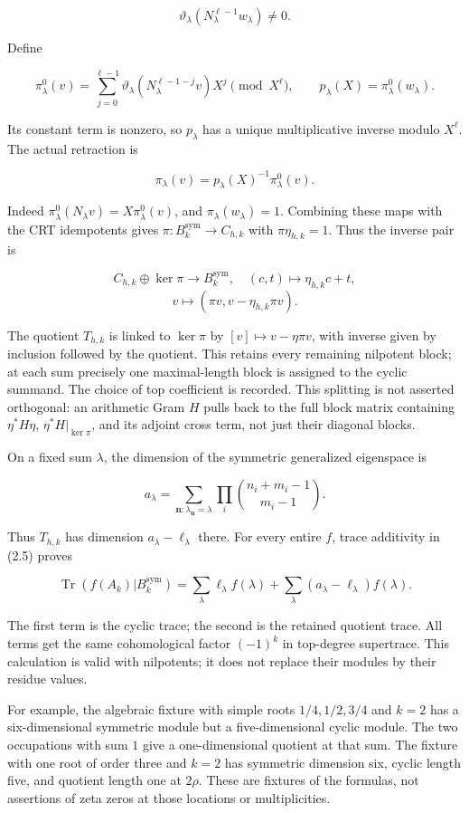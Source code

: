 \[\vartheta_\lambda(N_\lambda^{\ell-1}w_\lambda)\ne0.\]

Define

\[\pi^0_\lambda(v)=\sum_{j=0}^{\ell-1}
\vartheta_\lambda(N_\lambda^{\ell-1-j}v)X^j\pmod{X^\ell},\qquad
p_\lambda(X)=\pi^0_\lambda(w_\lambda).\]

Its constant term is nonzero, so \(p_\lambda\) has a unique
multiplicative inverse modulo \(X^\ell\). The actual retraction is

\[\boxed{\pi_\lambda(v)=p_\lambda(X)^{-1}\pi^0_\lambda(v).}\tag{2.5a}\]

Indeed \(\pi^0_\lambda(N_\lambda v)=X\pi^0_\lambda(v)\), and
\(\pi_\lambda(w_\lambda)=1\). Combining these maps with the CRT
idempotents gives \(\pi:B_k^{\mathrm{sym}}\to C_{h,k}\) with
\(\pi\eta_{h,k}=1\). Thus the inverse pair is

\[C_{h,k}\oplus\ker\pi\longrightarrow B_k^{\mathrm{sym}},\quad(c,t)\mapsto\eta_{h,k}c+t,\]
\[v\longmapsto(\pi v,v-\eta_{h,k}\pi v).\tag{2.5b}\]

The quotient \(T_{h,k}\) is linked to \(\ker\pi\) by
\([v]\mapsto v-\eta\pi v\), with inverse given by inclusion followed by
the quotient. This retains every remaining nilpotent block; at each sum
precisely one maximal-length block is assigned to the cyclic summand.
The choice of top coefficient is recorded. This splitting is not
asserted orthogonal: an arithmetic Gram \(H\) pulls back to the full
block matrix containing \(\eta^*H\eta\), \(\eta^*H|_{\ker\pi}\), and its
adjoint cross term, not just their diagonal blocks.

On a fixed sum \(\lambda\), the dimension of the symmetric generalized
eigenspace is

\[a_\lambda=\sum_{\mathbf n:\lambda_{\mathbf n}=\lambda}
\prod_i\binom{n_i+m_i-1}{m_i-1}.\tag{2.6}\]

Thus \(T_{h,k}\) has dimension \(a_\lambda-\ell_\lambda\) there. For
every entire \(f\), trace additivity in (2.5) proves

\[\operatorname{Tr}(f(A_k)|B_k^{\mathrm{sym}})=
\sum_\lambda \ell_\lambda f(\lambda)
+\sum_\lambda(a_\lambda-\ell_\lambda)f(\lambda).\tag{2.7}\]

The first term is the cyclic trace; the second is the retained quotient
trace. All terms get the same cohomological factor \((-1)^k\) in
top-degree supertrace. This calculation is valid with nilpotents; it
does not replace their modules by their residue values.

For example, the algebraic fixture with simple roots \(1/4,1/2,3/4\) and
\(k=2\) has a six-dimensional symmetric module but a five-dimensional
cyclic module. The two occupations with sum \(1\) give a one-dimensional
quotient at that sum. The fixture with one root of order three and
\(k=2\) has symmetric dimension six, cyclic length five, and quotient
length one at \(2\rho\). These are fixtures of the formulas, not
assertions of zeta zeros at those locations or multiplicities.


